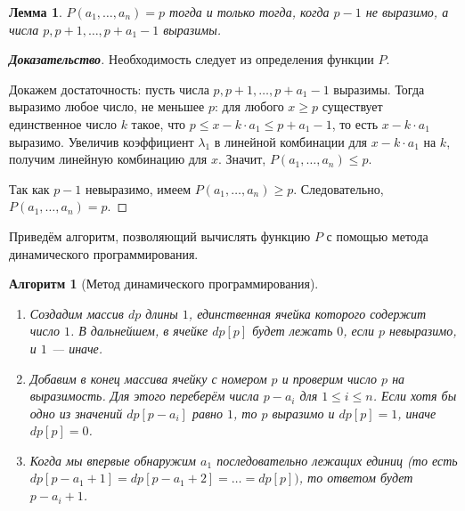 \documentclass[12pt]{article}
\newtheorem{lemma}[theorem]{Лемма}
\newtheorem{algorithm}[theorem]{Алгоритм}
\begin{document}
\begin{lemma}
\label{algorithm1:lemma2}
$P(a_1, \dots, a_n) = p$ тогда и только тогда, когда $p - 1$ не выразимо, а числа $p, p + 1, \dots, p + a_1 - 1$ выразимы.
\end{lemma}
\begin{proof}[\textbf{Доказательство}]
Необходимость следует из определения функции $P$.

Докажем достаточность: пусть числа $p, p + 1, \dots, p + a_1 - 1$ выразимы. Тогда выразимо любое число, не меньшее $p$: для любого $x \ge p$ существует единственное число $k$ такое, что $p \le x - k \cdot a_1 \le p + a_1 - 1$, то есть $x - k \cdot a_1$ выразимо. Увеличив коэффициент $\lambda_1$ в линейной комбинации для $x - k \cdot a_1$ на $k$, получим линейную комбинацию для $x$. Значит, $P(a_1, \dots, a_n) \le p$.

Так как $p - 1$ невыразимо, имеем $P(a_1, \dots, a_n) \ge p$. Следовательно, $P(a_1, \dots, a_n) = p$.
\end{proof}

Приведём алгоритм, позволяющий вычислять функцию $P$ с помощью метода динамического программирования.

\begin{algorithm}[Метод динамического программирования] { \ }
\label{algorithm1}
\begin{enumerate}
    \item Создадим массив $dp$ длины $1$, единственная ячейка которого содержит число $1$. В дальнейшем, в ячейке $dp[p]$ будет лежать $0$, если $p$ невыразимо, и $1$ --- иначе.
    
	\item Добавим в конец массива ячейку с номером $p$ и проверим число $p$ на выразимость. Для этого переберём числа $p - a_i$ для $1 \le i \le n$. Если хотя бы одно из значений $dp[p - a_i]$ равно $1$, то $p$ выразимо и $dp[p] = 1$, иначе $dp[p] = 0$.
   	
    \item Когда мы впервые обнаружим $a_1$ последовательно лежащих единиц (то есть\\  $dp[p - a_1 + 1] = dp[p - a_1 + 2] = \dots = dp[p])$, то ответом будет $p - a_i + 1$. 
\end{enumerate}
\end{algorithm}
\end{document}
